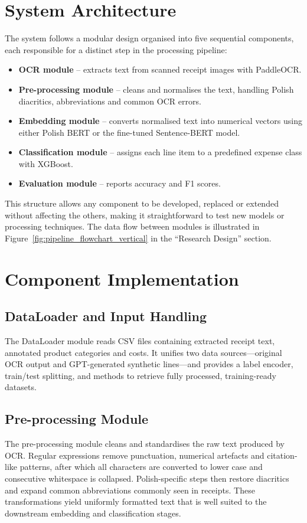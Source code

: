 \documentclass{SGGW-thesis-EN}
\begin{document}
\section{System Architecture}
The system follows a modular design organised into five sequential components, each responsible for a distinct step in
the processing pipeline:

\begin{itemize}
  \item \textbf{OCR module} – extracts text from scanned receipt images with PaddleOCR.
  \item \textbf{Pre-processing module} – cleans and normalises the text, handling Polish diacritics, abbreviations and
        common OCR errors.
  \item \textbf{Embedding module} – converts normalised text into numerical vectors using either Polish BERT or the
        fine-tuned Sentence-BERT model.
  \item \textbf{Classification module} – assigns each line item to a predefined expense class with XGBoost.
  \item \textbf{Evaluation module} – reports accuracy and F1 scores.
\end{itemize}

This structure allows any component to be developed, replaced or extended without affecting the others, making it
straightforward to test new models or processing techniques. The data flow between modules is illustrated in
Figure~\ref{fig:pipeline_flowchart_vertical} in the “Research Design” section.

\section{Component Implementation}

\subsection{DataLoader and Input Handling}
The DataLoader module reads CSV files containing extracted receipt text, annotated product categories and costs. 
It unifies two data sources—original OCR output and GPT-generated synthetic lines—and provides a label encoder, train/test splitting,
and methods to retrieve fully processed, training-ready datasets.

\subsection{Pre-processing Module}
The pre-processing module cleans and standardises the raw text produced by OCR. Regular expressions remove punctuation,
numerical artefacts and citation-like patterns, after which all characters are converted to lower case and consecutive
whitespace is collapsed. Polish-specific steps then restore diacritics and expand common abbreviations commonly seen in
receipts. These transformations yield uniformly formatted text that is well suited to the downstream embedding and
classification stages.
\end{document}
